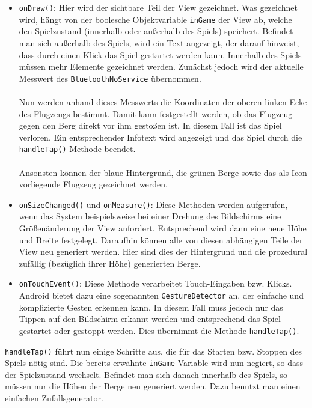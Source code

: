 \begin{itemize}
	\item \texttt{onDraw()}: Hier wird der sichtbare Teil der View gezeichnet.\cite{Src:CustomView} \cite{Src:AndroidKuenneth} Was gezeichnet wird, hängt von der boolesche Objektvariable \texttt{inGame} der View ab, welche den Spielzustand (innerhalb oder außerhalb des Spiels) speichert. Befindet man sich außerhalb des Spiels, wird ein Text angezeigt, der darauf hinweist, dass durch einen Klick das Spiel gestartet werden kann. Innerhalb des Spiels müssen mehr Elemente gezeichnet werden. Zunächst jedoch wird der aktuelle Messwert des \texttt{BluetoothNoService} übernommen. \\ \\
	Nun werden anhand dieses Messwerts die Koordinaten der oberen linken Ecke des Flugzeugs bestimmt. Damit kann festgestellt werden, ob das Flugzeug gegen den Berg direkt vor ihm gestoßen ist. In diesem Fall ist das Spiel verloren. Ein entsprechender Infotext wird angezeigt und das Spiel durch die \texttt{handleTap()}-Methode beendet. \\ \\
	Ansonsten können der blaue Hintergrund, die grünen Berge sowie das als Icon vorliegende Flugzeug gezeichnet werden.
	\item \texttt{onSizeChanged()} und \texttt{onMeasure()}: Diese Methoden werden aufgerufen, wenn das System beispielsweise bei einer Drehung des Bildschirms eine Größenänderung der View anfordert.\cite{Src:CustomView} Entsprechend wird dann eine neue Höhe und Breite festgelegt. Daraufhin können alle von diesen abhängigen Teile der View neu generiert werden. Hier sind dies der Hintergrund und die prozedural zufällig (bezüglich ihrer Höhe) generierten Berge.
	\item \texttt{onTouchEvent()}: Diese Methode verarbeitet Touch-Eingaben bzw. Klicks. \cite{Src:InteractiveView} Android bietet dazu eine sogenannten \texttt{GestureDetector} an, der einfache und komplizierte Gesten erkennen kann. In diesem Fall muss jedoch nur das Tippen auf den Bildschirm erkannt werden und entsprechend das Spiel gestartet oder gestoppt werden. Dies übernimmt die Methode \texttt{handleTap()}.
\end{itemize}
\texttt{handleTap()} führt nun einige Schritte aus, die für das Starten bzw. Stoppen des Spiels nötig sind. Die bereits erwähnte \texttt{inGame}-Variable wird nun negiert, so dass der Spielzustand wechselt. Befindet man sich danach innerhalb des Spiels, so müssen nur die Höhen der Berge neu generiert werden. Dazu benutzt man einen einfachen Zufallsgenerator. \\ \\

